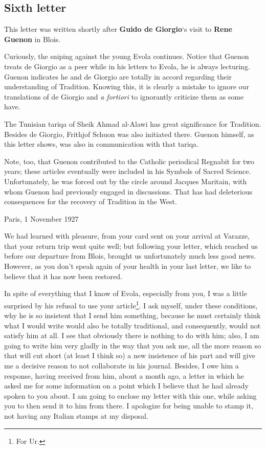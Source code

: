 \subsection{Sixth letter}

\begin{quotex}
This letter was written shortly after \textbf{Guido de Giorgio}`s visit to \textbf{Rene Guenon} in Blois.

Curiously, the sniping against the young Evola continues. Notice that Guenon treats de Giorgio as a peer while in his letters to Evola, he is always lecturing. Guenon indicates he and de Giorgio are totally in accord regarding their understanding of Tradition. Knowing this, it is clearly a mistake to ignore our translations of de Giorgio and \emph{a fortiori} to ignorantly criticize them as some have.

The Tunisian tariqa of Sheik Ahmad al-Alawi has great significance for Tradition. Besides de Giorgio, Frithjof Schuon was also initiated there. Guenon himself, as this letter shows, was also in communication with that tariqa.

Note, too, that Guenon contributed to the Catholic periodical Regnabit for two years; these articles eventually were included in his Symbols of Sacred Science. Unfortunately, he was forced out by the circle around Jacques Maritain, with whom Guenon had previously engaged in discussions. That has had deleterious consequences for the recovery of Tradition in the West.

\end{quotex}
Paris, 1 November 1927

We had learned with pleasure, from your card sent on your arrival at Varazze, that your return trip went quite well; but following your letter, which reached us before our departure from Blois, brought us unfortunately much less good news. However, as you don't speak again of your health in your last letter, we like to believe that it has now been restored.

In spite of everything that I know of Evola, especially from you, I was a little surprised by his refusal to use your article\footnote{For Ur.}. I ask myself, under these conditions, why he is so insistent that I send him something, because he must certainly think what I would write would also be totally traditional, and consequently, would not satisfy him at all. I see that obviously there is nothing to do with him; also, I am going to write him very gladly in the way that you ask me, all the more reason so that will cut short (at least I think so) a new insistence of his part and will give me a decisive reason to not collaborate in his journal. Besides, I owe him a response, having received from him, about a month ago, a letter in which he asked me for some information on a point which I believe that he had already spoken to you about. I am going to enclose my letter with this one, while asking you to then send it to him from there. I apologize for being unable to stamp it, not having any Italian stamps at my disposal.

